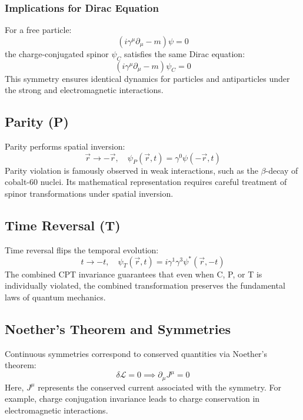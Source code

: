 \documentclass[12pt,a4paper]{article}
\begin{document}
\subsubsection{Implications for Dirac Equation}
For a free particle:
\begin{equation}
    (i \gamma^\mu \partial_\mu - m) \psi = 0
\end{equation}
the charge-conjugated spinor $\psi_C$ satisfies the same Dirac equation:
\begin{equation}
    (i \gamma^\mu \partial_\mu - m) \psi_C = 0
\end{equation}
This symmetry ensures identical dynamics for particles and antiparticles under the strong and electromagnetic interactions.

\subsection{Parity (P)}
Parity performs spatial inversion:
\begin{equation}
    \vec{r} \rightarrow -\vec{r}, \quad \psi_P(\vec{r},t) = \gamma^0 \psi(-\vec{r},t)
\end{equation}
Parity violation is famously observed in weak interactions, such as the $\beta$-decay of cobalt-60 nuclei. Its mathematical representation requires careful treatment of spinor transformations under spatial inversion.

\subsection{Time Reversal (T)}
Time reversal flips the temporal evolution:
\begin{equation}
    t \rightarrow -t, \quad \psi_T(\vec{r},t) = i \gamma^1 \gamma^3 \psi^*(\vec{r},-t)
\end{equation}
The combined CPT invariance guarantees that even when C, P, or T is individually violated, the combined transformation preserves the fundamental laws of quantum mechanics.

\subsection{Noether's Theorem and Symmetries}
Continuous symmetries correspond to conserved quantities via Noether's theorem:
\begin{equation}
    \delta \mathcal{L} = 0 \implies \partial_\mu J^\mu = 0
\end{equation}
Here, $J^\mu$ represents the conserved current associated with the symmetry. For example, charge conjugation invariance leads to charge conservation in electromagnetic interactions.
\end{document}

